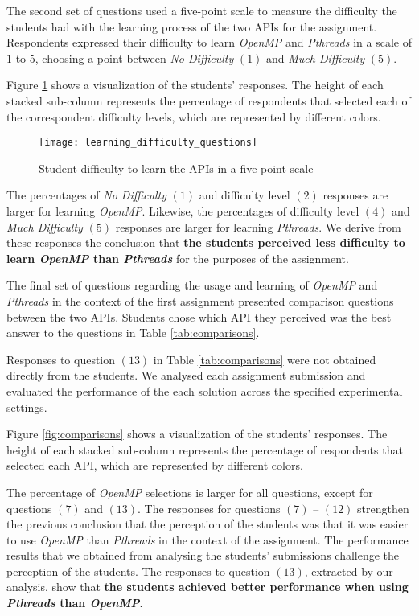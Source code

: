 The second set of questions used a five-point scale to measure the difficulty
the students had with the learning process of the two APIs for the assignment.
Respondents expressed their difficulty to learn \textit{OpenMP} and
\textit{Pthreads} in a scale of $1$ to $5$, choosing a point between \textit{No
Difficulty} $(1)$ and \textit{Much Difficulty} $(5)$.

Figure \ref{fig:learning} shows a visualization of the students' responses.
The height of each stacked sub-column represents the percentage of respondents
that selected each of the correspondent difficulty levels, which are
represented by different colors.

\begin{figure}[htpb]
    \centering
    \texttt{[image: learning\_difficulty\_questions]}
    \caption{Student difficulty to learn the APIs in a five-point scale}
    \label{fig:learning}
\end{figure}

The percentages of \textit{No Difficulty} $(1)$ and difficulty level $(2)$
responses are larger for learning \textit{OpenMP}. Likewise, the
percentages of difficulty level $(4)$ and \textit{Much Difficulty} $(5)$
responses are larger for learning \textit{Pthreads}.  We derive
from these responses the conclusion that \textbf{the students perceived less
difficulty to learn \textit{OpenMP} than \textit{Pthreads}} for the purposes of
the assignment.

The final set of questions regarding the usage and learning of \textit{OpenMP}
and \textit{Pthreads} in the context of the first assignment presented
comparison questions between the two APIs. Students chose which API they
perceived was the best answer to the questions in Table \ref{tab:comparisons}.

Responses to question $(13)$ in Table \ref{tab:comparisons} were not obtained
directly from the students. We analysed each assignment submission and
evaluated the performance of the each solution across the specified
experimental settings.

Figure \ref{fig:comparisons} shows a visualization of the students' responses.
The height of each stacked sub-column represents the percentage of respondents
that selected each API, which are represented by different colors.

The percentage of \textit{OpenMP} selections is larger for all
questions, except for questions $(7)$ and $(13)$. The responses for questions
$(7)$ -- $(12)$ strengthen the previous conclusion that the perception of the
students was that it was easier to use \textit{OpenMP} than \textit{Pthreads}
in the context of the assignment. The performance results that we obtained from
analysing the students' submissions challenge the perception of the students.
The responses to question $(13)$, extracted by our analysis, show that
\textbf{the students achieved better performance when using \textit{Pthreads}
than \textit{OpenMP}}.

